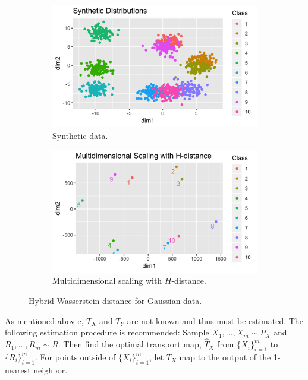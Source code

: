 \documentclass[11pt, a4paper, fleqn]{article}
\numberwithin{equation}{section}
\numberwithin{figure}{section}
\numberwithin{table}{section}
\begin{document}
\begin{figure}[b]
\begin{subfigure}[b]{.5\textwidth}
\centering
\includegraphics[width=\linewidth]{LabeledNormalPlot}
        \caption{Synthetic data.}
        \label{fig:synthetic_exp_1}
\end{subfigure}
\begin{subfigure}[b]{.5\textwidth}
\centering
\includegraphics[width=\linewidth]{MDSNormalPlot}
        \caption{Multidimensional scaling with $H$-distance.}
        \label{fig:synthetic_exp_2}
\end{subfigure}
\caption{Hybrid Wasserstein distance for Gaussian data.}
\label{fig:synthetic_exp}
\end{figure}

As mentioned abov e, $T_X$ and $T_Y$ are not known and thus must be estimated. The following estimation procedure is recommended: Sample $X_1, ..., X_m \sim \tilde{P}_X$ and $R_1, ..., R_m \sim R$. Then find the optimal transport map, $\hat{T}_X$ from $\{X_i\}_{i=1}^m$ to $\{R_i\}_{i=1}^m$. For points outside of $\{X_i\}_{i=1}^m$, let $T_X$ map to the output of the 1-nearest neighbor.
\end{document}
